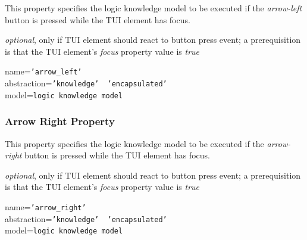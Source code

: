 This property specifies the logic knowledge model to be executed if the
\emph{arrow-left} button is pressed while the TUI element has focus.

\emph{optional}, only if TUI element should react to button press event;
a prerequisition is that the TUI element's \emph{focus} property value is \emph{true}

name=\texttt{'arrow\_left'}\\
abstraction=\texttt{'knowledge' \vline\ 'encapsulated'}\\
model=\texttt{logic knowledge model}

\subsubsection{Arrow Right Property}

This property specifies the logic knowledge model to be executed if the
\emph{arrow-right} button is pressed while the TUI element has focus.

\emph{optional}, only if TUI element should react to button press event;
a prerequisition is that the TUI element's \emph{focus} property value is \emph{true}

name=\texttt{'arrow\_right'}\\
abstraction=\texttt{'knowledge' \vline\ 'encapsulated'}\\
model=\texttt{logic knowledge model}
